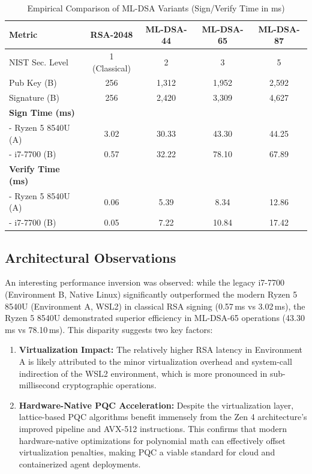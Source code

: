 \documentclass[conference]{IEEEtran}
\begin{document}
\begin{table}[htbp]
\caption{Empirical Comparison of ML-DSA Variants (Sign/Verify Time in ms)}
\begin{center}
\small
\begin{tabularx}{\linewidth}{|l|C|C|C|C|}
\hline
\textbf{Metric} & \textbf{RSA-2048} & \textbf{ML-DSA-44} & \textbf{ML-DSA-65} & \textbf{ML-DSA-87} \\
\hline
NIST Sec. Level & 1 (Classical) & 2 & 3 & 5 \\
Pub Key (B) & 256 & 1,312 & 1,952 & 2,592 \\
Signature (B) & 256 & 2,420 & 3,309 & 4,627 \\
\hline
\textbf{Sign Time (ms)} & & & & \\
- Ryzen 5 8540U (A) & 3.02 & 30.33 & 43.30 & 44.25 \\
- i7-7700 (B) & 0.57 & 32.22 & 78.10 & 67.89 \\
\hline
\textbf{Verify Time (ms)} & & & & \\
- Ryzen 5 8540U (A) & 0.06 & 5.39 & 8.34 & 12.86 \\
- i7-7700 (B) & 0.05 & 7.22 & 10.84 & 17.42 \\
\hline
\end{tabularx}
\label{tab:mldsa_detailed}
\end{center}
\end{table}

\subsection{Architectural Observations}
An interesting performance inversion was observed: while the legacy i7-7700 (Environment B, Native Linux) significantly outperformed the modern Ryzen 5 8540U (Environment A, WSL2) in classical RSA signing (0.57\,ms vs 3.02\,ms), the Ryzen 5 8540U demonstrated superior efficiency in ML-DSA-65 operations (43.30\,ms vs 78.10\,ms). This disparity suggests two key factors:
\begin{enumerate}
    \item \textbf{Virtualization Impact:} The relatively higher RSA latency in Environment A is likely attributed to the minor virtualization overhead and system-call indirection of the WSL2 environment, which is more pronounced in sub-millisecond cryptographic operations.
    \item \textbf{Hardware-Native PQC Acceleration:} Despite the virtualization layer, lattice-based PQC algorithms benefit immensely from the Zen 4 architecture's improved pipeline and AVX-512 instructions. This confirms that modern hardware-native optimizations for polynomial math can effectively offset virtualization penalties, making PQC a viable standard for cloud and containerized agent deployments.
\end{enumerate}
\end{document}
